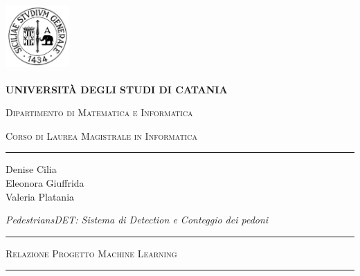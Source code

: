 \documentclass[12pt]{article}
\begin{document}
\begin{titlepage}
\centering 
\includegraphics[width=2.434cm,height=2.565cm]{./R.png}

\bigskip

{\Large \textbf{UNIVERSIT\`A DEGLI STUDI DI CATANIA}}

{\scshape
\large
Dipartimento di Matematica e Informatica
}

{\scshape
\normalsize
Corso di Laurea Magistrale in Informatica
}

\bigskip


\hrule


\bigskip


\bigskip


\bigskip


\bigskip


{
\large
Denise Cilia \\
Eleonora Giuffrida \\
Valeria Platania 
\par}

\bigskip


\bigskip


\bigskip


\bigskip

{\centering
\Large
\it
PedestriansDET: Sistema di Detection e Conteggio dei pedoni
\par}


\bigskip


\bigskip


\bigskip


\bigskip


\bigskip


\bigskip


\begin{minipage}[b]{8 cm}
\hrule

\bigskip

{\centering\scshape 
Relazione Progetto Machine Learning
\par}



\bigskip

\hrule
\end{minipage}
\bigskip


\bigskip


\bigskip



\end{titlepage}
\end{document}
